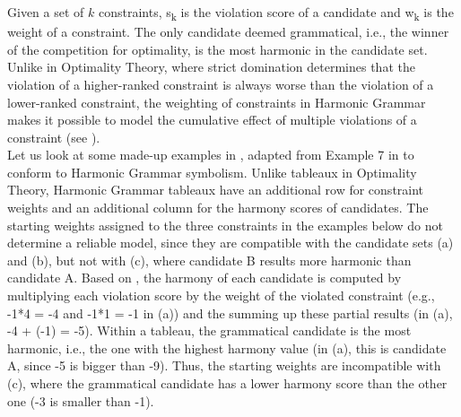 Given a set of $k$ constraints, s\textsubscript{k} is the violation score of a candidate and w\textsubscript{k} is the weight of a constraint. The only candidate deemed grammatical, i.e., the winner of the competition for optimality, is the most harmonic in the candidate set. Unlike in Optimality Theory, where strict domination determines that the violation of a higher-ranked constraint is always worse than the violation of a lower-ranked constraint, the weighting of constraints in Harmonic Grammar makes it possible to model the cumulative effect of multiple violations of a constraint (see ). \\
Let us look at some made-up examples in , adapted from Example 7 in \textcite{kuhn2002corpus} to conform to Harmonic Grammar symbolism. Unlike tableaux in Optimality Theory, Harmonic Grammar tableaux have an additional row for constraint weights and an additional column for the harmony scores of candidates. The starting weights assigned to the three constraints in the examples below do not determine a reliable model, since they are compatible with the candidate sets (a) and (b), but not with (c), where candidate B results more harmonic than candidate A.  Based on , the harmony of each candidate is computed by multiplying each violation score by the weight of the violated constraint (e.g., -1*4 = -4 and -1*1 = -1 in (a)) and the summing up these partial results (in (a), -4 + (-1) = -5). Within a tableau, the grammatical candidate is the most harmonic, i.e., the one with the highest harmony value (in (a), this is candidate A, since -5 is bigger than -9). Thus, the starting weights are incompatible with (c), where the grammatical candidate has a lower harmony score than the other one (-3 is smaller than -1).


